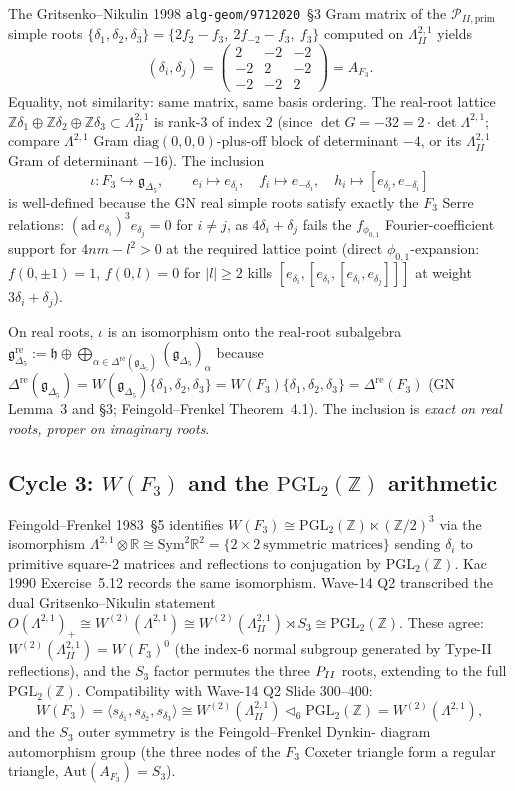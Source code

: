 \documentclass[12pt]{article}
\providecommand{\Z}{\mathbb{Z}}
\providecommand{\R}{\mathbb{R}}
\providecommand{\fh}{\mathfrak{h}}
\providecommand{\gDelta}{\mathfrak{g}_{\Delta_5}}
\providecommand{\FF}{F_3}
\providecommand{\LambII}{\Lambda^{2,1}_{II}}
\providecommand{\Lam}{\Lambda^{2,1}}
\providecommand{\Dre}{\Delta^{\mathrm{re}}}
\providecommand{\PGL}{\mathrm{PGL}}
\begin{document}
The Gritsenko--Nikulin 1998 \texttt{alg-geom/9712020}~\S 3 Gram
matrix of the $\mathcal{P}_{II,\mathrm{prim}}$ simple roots
$\{\delta_1, \delta_2, \delta_3\} = \{2f_2 - f_3,\ 2f_{-2} - f_3,\
f_3\}$ computed on $\LambII$ yields
\[
  (\delta_i,\delta_j) = \begin{pmatrix} 2 & -2 & -2 \\ -2 & 2 & -2 \\ -2 & -2 & 2\end{pmatrix} = A_{\FF}.
\]
Equality, not similarity: same matrix, same basis ordering. The
real-root lattice $\Z\delta_1 \oplus \Z\delta_2 \oplus \Z\delta_3
\subset \LambII$ is rank-$3$ of index $2$ (since
$\det G = -32 = 2 \cdot \det \Lam$; compare $\Lam$ Gram
$\mathrm{diag}(0,0,0)$-plus-off block of determinant $-4$, or its
$\LambII$ Gram of determinant $-16$). The inclusion
\[
  \iota\colon \FF \hookrightarrow \gDelta, \qquad
  e_i \mapsto e_{\delta_i}, \quad f_i \mapsto e_{-\delta_i}, \quad
  h_i \mapsto [e_{\delta_i}, e_{-\delta_i}]
\]
is well-defined because the GN real simple roots satisfy exactly
the $\FF$ Serre relations: $(\mathrm{ad}\,e_{\delta_i})^3 e_{\delta_j} = 0$
for $i \neq j$, as $4\delta_i + \delta_j$ fails the $f_{\phi_{0,1}}$
Fourier-coefficient support for $4nm - l^2 > 0$ at the required
lattice point (direct $\phi_{0,1}$-expansion:
$f(0,\pm 1) = 1$, $f(0,l) = 0$ for $|l|\geq 2$ kills
$[e_{\delta_i},[e_{\delta_i},[e_{\delta_i},e_{\delta_j}]]]$ at
weight $3\delta_i + \delta_j$).

On real roots, $\iota$ is an isomorphism onto the real-root
subalgebra $\gDelta^{\mathrm{re}} := \fh \oplus
\bigoplus_{\alpha \in \Dre(\gDelta)} (\gDelta)_\alpha$ because
$\Dre(\gDelta) = W(\gDelta)\{\delta_1,\delta_2,\delta_3\}
= W(\FF)\{\delta_1,\delta_2,\delta_3\} = \Dre(\FF)$ (GN
Lemma~3 and \S 3; Feingold--Frenkel Theorem~4.1). The inclusion
is \emph{exact on real roots, proper on imaginary roots}.

\subsection*{Cycle 3: $W(\FF)$ and the $\PGL_2(\Z)$ arithmetic}

Feingold--Frenkel 1983~\S 5 identifies $W(\FF) \cong \PGL_2(\Z)
\ltimes (\Z/2)^3$ via the isomorphism $\Lam \otimes \R \cong
\mathrm{Sym}^2 \R^2 = \{2\times 2\ \text{symmetric matrices}\}$
sending $\delta_i$ to primitive square-$2$ matrices and
reflections to conjugation by $\PGL_2(\Z)$. Kac 1990 Exercise~5.12
records the same isomorphism. Wave-14 Q2 transcribed the dual
Gritsenko--Nikulin statement $O(\Lam)_+ \cong W^{(2)}(\Lam) \cong
W^{(2)}(\LambII) \rtimes S_3 \cong \PGL_2(\Z)$. These agree:
$W^{(2)}(\LambII) = W(\FF)^0$ (the index-$6$ normal subgroup
generated by Type-II reflections), and the $S_3$ factor permutes
the three $P_{II}$ roots, extending to the full $\PGL_2(\Z)$.
Compatibility with Wave-14 Q2 Slide 300--400:
\[
  W(\FF) = \langle s_{\delta_1}, s_{\delta_2}, s_{\delta_3}\rangle
  \cong W^{(2)}(\LambII) \lhd_6 \PGL_2(\Z)
  = W^{(2)}(\Lam),
\]
and the $S_3$ outer symmetry is the Feingold--Frenkel Dynkin-
diagram automorphism group (the three nodes of the $\FF$ Coxeter
triangle form a regular triangle, $\mathrm{Aut}(A_{\FF}) = S_3$).
\end{document}
